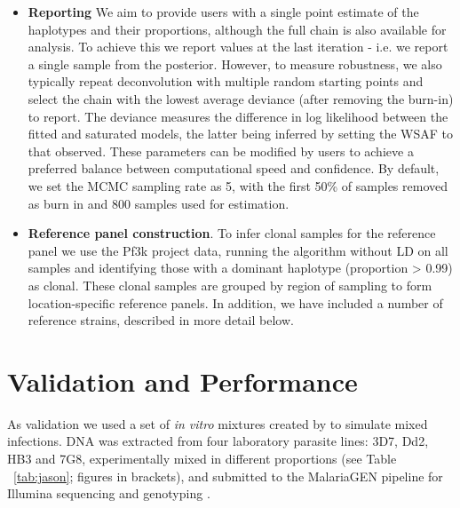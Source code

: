 \documentclass{bioinfo}
\begin{document}
\begin{itemize}
\item {\bf Reporting} We aim to provide users with a single point estimate of the haplotypes and their proportions, although the full chain is also available for analysis.  To achieve this we report values at the last iteration - i.e. we report a single sample from the posterior.  However, to measure robustness, we also typically repeat deconvolution with multiple random starting points and select the chain with the lowest average deviance (after removing the burn-in) to report. The deviance measures the difference in log likelihood between the fitted and saturated models, the latter being inferred by setting the WSAF to that observed.   These parameters can be modified by users to achieve a preferred balance between computational speed and confidence.  By default, we set the MCMC sampling rate as 5, with the first 50\% of samples removed as burn in and 800 samples used for estimation.

\item {\bf Reference panel construction}. To infer clonal samples for the reference panel we use the Pf3k \citep{Pf3k2016} project data, running the algorithm without LD on all samples and identifying those with a dominant haplotype (proportion > 0.99) as clonal.  These clonal samples are grouped by region of sampling to form location-specific reference panels.  In addition, we have included a number of reference strains, described in more detail below.

\end{itemize}




\section{Validation and Performance}

As validation we used a set of {\it in vitro} mixtures created by \citet{Wendler2015} to simulate mixed infections. DNA was extracted from four laboratory parasite lines: 3D7, Dd2, HB3 and 7G8, experimentally mixed in different proportions (see Table ~\ref{tab:jason}; figures in brackets), and submitted to the MalariaGEN pipeline \citep{MalariaGen2008} for Illumina sequencing and genotyping \citep{Menske2012}.
\end{document}
